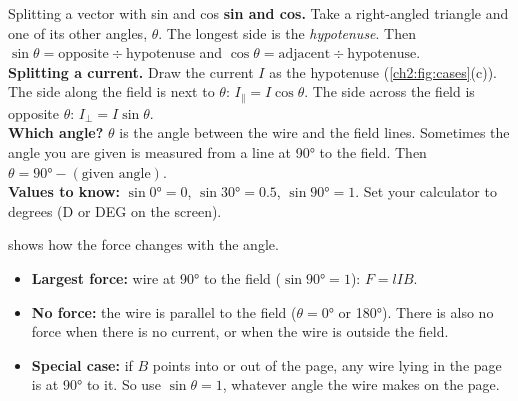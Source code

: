 \begin{toolkit}{Splitting a vector with sin and cos}
\textbf{sin and cos.} Take a right-angled triangle and one of its other angles, $\theta$. The
longest side is the \emph{hypotenuse}. Then $\sin\theta = \text{opposite} \div
\text{hypotenuse}$ and $\cos\theta = \text{adjacent} \div \text{hypotenuse}$.\\
\textbf{Splitting a current.} Draw the current $I$ as the hypotenuse (\cref{ch2:fig:cases}(c)).
The side along the field is next to $\theta$: $I_\parallel = I\cos\theta$. The side across the
field is opposite $\theta$: $I_\perp = I\sin\theta$.\\
\textbf{Which angle?} $\theta$ is the angle between the wire and the field lines. Sometimes the
angle you are given is measured from a line at \ang{90} to the field. Then
$\theta = \ang{90} - (\text{given angle})$.\\
\textbf{Values to know:} $\sin\ang{0} = 0$, $\sin\ang{30} = 0.5$, $\sin\ang{90} = 1$. Set your
calculator to degrees (D or DEG on the screen).
\end{toolkit}

\begin{sidebyside}[0.44]
  \centering
  \label{ch2:fig:sine}
\nextside
   shows how the force changes with the angle.
  \begin{itemize}
    \item \textbf{Largest force:} wire at \ang{90} to the field ($\sin\ang{90} = 1$): $F = lIB$.
    \item \textbf{No force:} the wire is parallel to the field ($\theta = \ang{0}$ or \ang{180}).
          There is also no force when there is no current, or when the wire is outside the field.
    \item \textbf{Special case:} if $B$ points into or out of the page, any wire lying in the page
          is at \ang{90} to it. So use $\sin\theta = 1$, whatever angle the wire makes on the page.
  \end{itemize}
\end{sidebyside}

